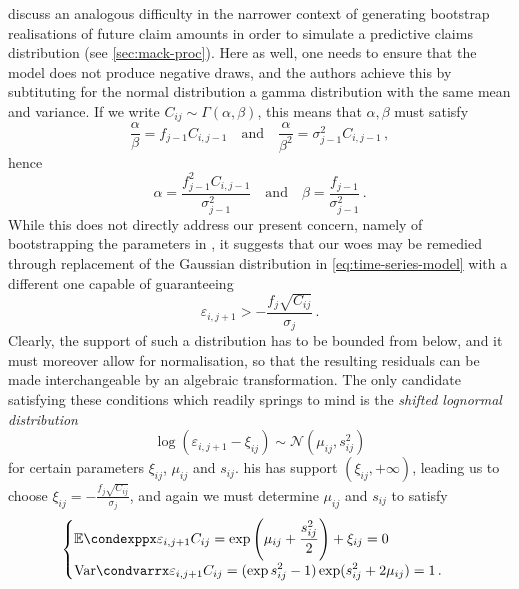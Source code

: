 \documentclass[a4paper]{book}
\begin{document}
\Textcite[238]{england:dist} discuss an analogous difficulty in the narrower context of generating bootstrap realisations of future claim amounts in order to simulate a predictive claims distribution (see \cref{sec:mack-proc}). Here as well, one needs to ensure that the model does not produce negative draws, and the authors achieve this by subtituting for the normal distribution a gamma distribution with the same mean and variance. If we write $C_{ij} \sim \Gamma(\alpha, \beta)$, this means that $\alpha, \beta$ must satisfy
\begin{equation}
  \frac{\alpha}{\beta} = f_{j-1} C_{i, j-1} \quad \text{and} \quad \frac{\alpha}{\beta^2} = \sigma^2_{j-1} C_{i, j-1} \,,
\end{equation}
hence
\begin{equation} \label{eq:gamma-sim}
  \alpha = \frac{f_{j-1}^2 C_{i, j-1}}{\sigma_{j-1}^2} \quad \text{and} \quad \beta = \frac{f_{j-1}}{\sigma_{j-1}^2} \,.
\end{equation}
While this does not directly address our present concern, namely of bootstrapping the parameters in , it suggests that our woes may be remedied through replacement of the Gaussian distribution in \cref{eq:time-series-model} with a different one capable of guaranteeing
\begin{equation} \label{eq:lower-limit-err}
  \varepsilon_{i, j + 1} > -\frac{f_j \sqrt{C_{ij}}}{\sigma_j} \,.
\end{equation}
Clearly, the support of such a distribution has to be bounded from below, and it must moreover allow for normalisation, so that the resulting residuals can be made interchangeable by an algebraic transformation. The only candidate satisfying these conditions which readily springs to mind is the \emph{shifted lognormal distribution}
\begin{equation}
  \log(\varepsilon_{i, j + 1} - \xi_{ij}) \sim \mathcal{N}(\mu_{ij}, s_{ij}^2)
\end{equation}
for certain parameters $\xi_{ij}$, $\mu_{ij}$ and $s_{ij}$. his has support $(\xi_{ij}, +\infty)$, leading us to choose $\xi_{ij} = -\frac{f_j \sqrt{C_{ij}}}{\sigma_j}$, and again we must determine $\mu_{ij}$ and $s_{ij}$ to satisfy
\begin{equation}
  \begin{cases}
    \displaystyle \condexpp{\varepsilon_{i, j + 1}}{C_{ij}} = \exp \left( \mu_{ij} + \frac{s_{ij}^2}{2} \right) + \xi_{ij} = 0 \\
    \displaystyle \condvarr{\varepsilon_{i, j + 1}}{C_{ij}} = (\exp{s_{ij}^2} - 1) \exp(s_{ij}^2 + 2 \mu_{ij}) = 1 \,.
  \end{cases}
\end{equation}
\end{document}
